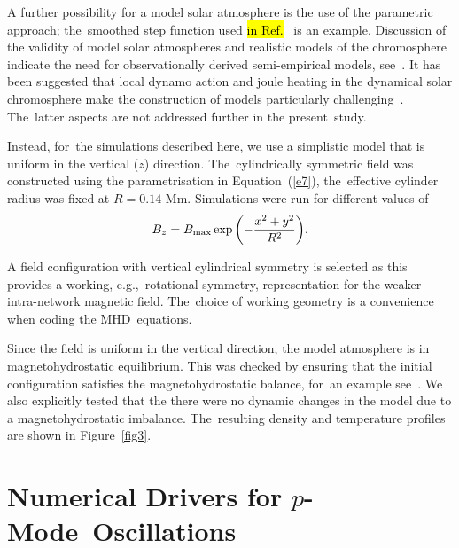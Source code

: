 \documentclass[physics,article,accept,pdftex,moreauthors]{Definitions/mdpi}
\begin{document}
A further possibility for a model solar atmosphere is the use of the parametric approach; the~smoothed step function used %
\hl{in Ref.}~\cite{Murawski2010} is an example. Discussion of the validity of model solar atmospheres and realistic models of the chromosphere  indicate the need for observationally derived semi-empirical models, see~\cite{Carlsson1995,Kalkofen2012}. It has been suggested that local dynamo action and joule heating in the dynamical solar chromosphere make the construction of models particularly challenging~\cite{Leenaarts2011}. The~latter aspects are not addressed further in the present~study.


Instead, for~the simulations described here, we use a simplistic model  that is uniform in the vertical ($z$) direction. The~cylindrically 
symmetric field was constructed using  the parametrisation in Equation~(\ref{e7}), the~effective cylinder radius was fixed at $R=0.14$ Mm. 
Simulations were run for different values of  %
\begin{equation}
B_{z}=B_{\rm max} %
\exp{\left(-\frac{x^2+y^2}{R^2}\right)}. 
\label{e7}
\end{equation}

A field configuration with vertical cylindrical symmetry is selected as this provides a working, e.g.,~rotational symmetry, representation for  the weaker intra-network magnetic field. The~choice of working geometry is a convenience when coding the MHD~equations.

Since the field is uniform in the vertical direction, the model atmosphere is in magnetohydrostatic equilibrium. This was checked by ensuring that the initial configuration satisfies the magnetohydrostatic balance, for~an example see~\cite{Schussler2005,Gent2013}. We also explicitly tested that the there were no dynamic changes in the model due to a magnetohydrostatic imbalance. The~resulting density and temperature profiles are shown in Figure~\ref{fig3}. 


\section{Numerical Drivers for $p$-Mode~Oscillations}
\end{document}
